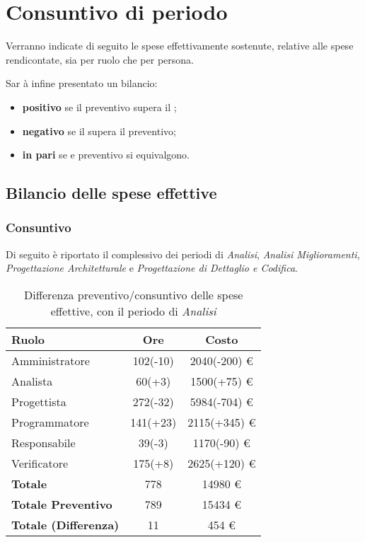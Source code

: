 \section{Consuntivo di periodo} %
Verranno indicate di seguito le spese effettivamente sostenute, relative alle spese rendicontate, sia per ruolo che per persona.

Sar \`a infine presentato un bilancio:
\begin{itemize}
\item \textbf{positivo} se il preventivo supera il ;
\item \textbf{negativo} se il  supera il preventivo;
\item \textbf{in pari} se  e preventivo si equivalgono.
\end{itemize}

\subsection{Bilancio delle spese effettive}
\subsubsection{Consuntivo}
Di seguito \`e riportato il  complessivo dei periodi di \textit{Analisi}, \textit{Analisi Miglioramenti}, \textit{Progettazione Architetturale} e \textit{Progettazione di Dettaglio e Codifica}.


\begin{table}[H]
	\centering
	\begin{tabular}{ l c c }
		\textbf{Ruolo} & \textbf{Ore} & \textbf{Costo} \\
		\hline
		Amministratore & 102(-10) & 2040(-200) \euro{} \\
		Analista & 60(+3) & 1500(+75) \euro{} \\
		Progettista & 272(-32) & 5984(-704) \euro{} \\
		Programmatore & 141(+23) & 2115(+345) \euro{} \\
		Responsabile & 39(-3) & 1170(-90) \euro{} \\
		Verificatore & 175(+8) & 2625(+120) \euro{} \\
		\hline
		\textbf{Totale \glossaryItem{Consuntivo}} & 778 & 14980 \euro{} \\
		\hline
		\textbf{Totale Preventivo} & 789 & 15434 \euro{} \\
		\hline
		\textbf{Totale (Differenza)} & 11 & 454 \euro{} \\
		\hline
	\end{tabular}
	\caption{Differenza preventivo/consuntivo delle spese effettive, con il periodo di \textit{Analisi}}
\end{table}


